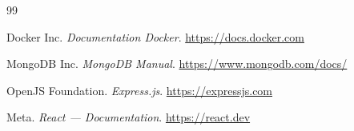 \documentclass[11pt,a4paper]{article}
\begin{document}
\begin{thebibliography}{99}

Docker Inc.
\newblock \emph{Documentation Docker}.
\newblock \url{https://docs.docker.com}

MongoDB Inc.
\newblock \emph{MongoDB Manual}.
\newblock \url{https://www.mongodb.com/docs/}

OpenJS Foundation.
\newblock \emph{Express.js}.
\newblock \url{https://expressjs.com}

Meta.
\newblock \emph{React — Documentation}.
\newblock \url{https://react.dev}

\end{thebibliography}
\end{document}
